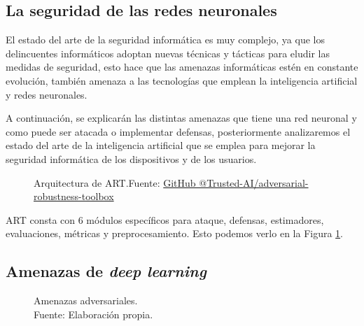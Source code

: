 \subsection{La seguridad de las redes neuronales}
\label{ch:2:section:state-of-the-art:computer-security-in-neural-networks}


El estado del arte de la seguridad informática es muy complejo, ya que los delincuentes informáticos adoptan nuevas técnicas y tácticas para eludir las medidas de seguridad, esto hace que las amenazas informáticas estén en constante evolución, también amenaza a las tecnologías que emplean la inteligencia artificial y redes neuronales.

A continuación, se explicarán las distintas amenazas que tiene una red neuronal y como puede ser atacada o implementar defensas, posteriormente analizaremos el estado del arte de la inteligencia artificial que se emplea para mejorar la seguridad informática de los dispositivos y de los usuarios.

\begin{figure}[H]
    \centering
    \centerline{}
    \caption{Arquitectura de ART.\newline{}Fuente: \href{https://github.com/Trusted-AI/adversarial-robustness-toolbox/wiki/ART-Architecture-and-Roadmap}{GitHub @Trusted-AI/adversarial-robustness-toolbox}}
    \label{fig:art-architecture}
\end{figure}

ART \cite{art2018} consta con 6 módulos específicos para ataque, defensas, estimadores, evaluaciones, métricas y preprocesamiento. Esto podemos verlo en la Figura \ref{fig:art-architecture}.

\subsection{Amenazas de \textit{deep learning}}
\begin{figure}[H]
    \centering
    \centerline{}
    \caption{Amenazas adversariales.\\Fuente: Elaboración propia.}
    \label{fig:art-adversarial-threats}
\end{figure}

